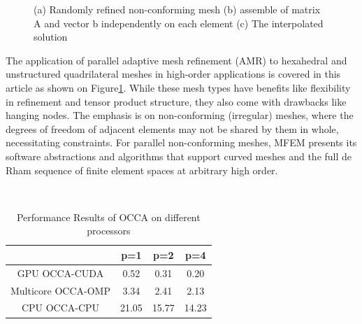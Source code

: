 \documentclass[11pt,a4paper]{article}
\begin{document}
\begin{figure}
    \centering
    
    \caption{(a) Randomly refined non-conforming mesh (b)  assemble of matrix A and vector b independently on each element (c) The interpolated solution}
    \label{fig:2}
\end{figure}

The application of parallel adaptive mesh refinement (AMR) to hexahedral and unstructured quadrilateral meshes in high-order applications is covered in this article as shown on Figure\ref{fig:2}. While these mesh types have benefits like flexibility in refinement and tensor product structure, they also come with drawbacks like hanging nodes. The emphasis is on non-conforming (irregular) meshes, where the degrees of freedom of adjacent elements may not be shared by them in whole, necessitating constraints. For parallel non-conforming meshes, MFEM presents its software abstractions and algorithms that support curved meshes and the full de Rham sequence of finite element spaces at arbitrary high order. 

\\
\begin{table}[h!]
\centering
\begin{tabular}{||c c c c||} 
 \hline
  & p=1 & p=2 & p=4\\ [0.5ex] 
 \hline\hline
 GPU OCCA-CUDA& 0.52 & 0.31 & 0.20 \\ 
 \hline
 Multicore OCCA-OMP& 3.34   &2.41 & 2.13 \\
 \hline
 CPU OCCA-CPU& 21.05   & 15.77 & 14.23 \\
 \hline
\end{tabular}
\caption{Performance Results of OCCA on different processors}
\label{table:1}
\end{table}
\\
\end{document}
